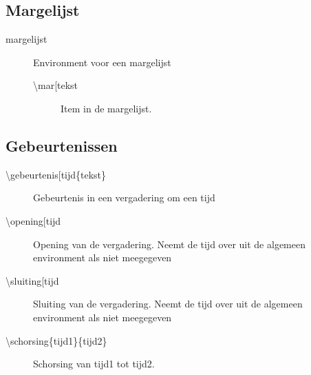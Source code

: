 \documentclass[a4paper]{notulen}
\begin{document}
		\subsection{Margelijst}
		\begin{description}
			\item[margelijst] Environment voor een margelijst
			\begin{description}
    			\item[\textbackslash mar[tekst\rbrack] Item in de margelijst.
 			\end{description}

		\end{description}
		\subsection{Gebeurtenissen}
		\begin{description}
    		\item[\textbackslash gebeurtenis[tijd\rbrack\{tekst\}] Gebeurtenis in een vergadering om een tijd
    		\item[\textbackslash opening[tijd\rbrack] Opening van de vergadering. Neemt de tijd over uit de algemeen environment als niet meegegeven
    		\item[\textbackslash sluiting[tijd\rbrack] Sluiting van de vergadering. Neemt de tijd over uit de algemeen environment als niet meegegeven
    		\item[\textbackslash schorsing\{tijd1\}\{tijd2\}] Schorsing van tijd1 tot tijd2.

		\end{description}
\end{document}
